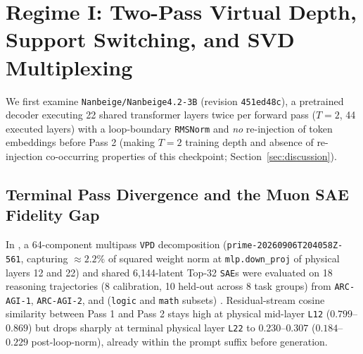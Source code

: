 \documentclass[10pt,letterpaper]{article}
\begin{document}
\section{Regime I: Two-Pass Virtual Depth, Support Switching, and SVD Multiplexing}\label{sec:regime1}

We first examine \texttt{Nanbeige/Nanbeige4.2-3B} \cite{nanbeige2026model} (revision \texttt{451ed48c}), a pretrained decoder executing 22 shared transformer layers twice per forward pass ($T=2$, 44 executed layers) with a loop-boundary \texttt{RMSNorm} and \emph{no} re-injection of token embeddings before Pass 2 (making $T=2$ training depth and absence of re-injection co-occurring properties of this checkpoint; Section~\ref{sec:discussion}).

\subsection{Terminal Pass Divergence and the Muon SAE Fidelity Gap}

In \cite{dugan2026vpd}, a 64-component multipass \texttt{VPD} decomposition (\texttt{prime-20260906T204058Z-561}, capturing $\approx 2.2\%$ of squared weight norm at \texttt{mlp.down\_proj} of physical layers 12 and 22) and shared 6,144-latent Top-32 \texttt{SAE}s were evaluated on 18 reasoning trajectories (8 calibration, 10 held-out across 8 task groups) from \texttt{ARC-AGI-1}, \texttt{ARC-AGI-2}, and  (\texttt{logic} and \texttt{math} subsets) \cite{primeintellect2025intellect3}. Residual-stream cosine similarity between Pass 1 and Pass 2 stays high at physical mid-layer \texttt{L12} ($0.799$--$0.869$) but drops sharply at terminal physical layer \texttt{L22} to $0.230$--$0.307$ ($0.184$--$0.229$ post-loop-norm), already within the prompt suffix before generation.
\end{document}
